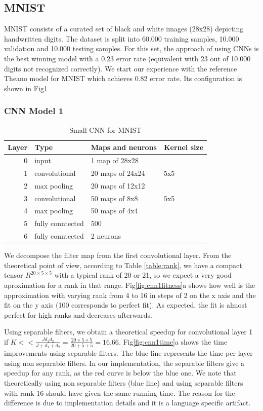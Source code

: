 \documentclass{article} %
\begin{document}
\subsection{MNIST}
MNIST consists of a curated set of black and white images (28x28) depicting handwritten digits.
The dataset is split into 60.000 training samples, 10.000 validation and 
10.000 testing samples. For this set, the approach of \cite{DBLP:journals/corr/abs-1202-2745} using CNNs is the best winning model with a 0.23 error rate (equivalent with 23 out of 10.000 digits not recognized correctly).
We start our experience with the reference Theano model for MNIST which achieves 0.82 error rate. Its configuration is shown in Fig\ref{fig:cnn1}
\subsubsection{CNN Model 1}
\begin{table}
\centering
\begin{tabular}{@{}rlll@{}}\toprule
Layer & Type & Maps and neurons& Kernel size \\ \midrule
0 & input & 1 map of 28x28 &\\
1& convolutional & 20 maps of 24x24 & 5x5\\
2 & max pooling & 20 maps of 12x12 &  \\
3 & convolutional & 50 maps of 8x8& 5x5 \\
4 & max pooling & 50 maps of 4x4&  \\ 
5 & fully conntected& 500 & \\
6 & fully conntected & 2 neurons & \\ \bottomrule
\end{tabular}
\caption{Small CNN for MNIST}
\label{fig:cnn1}
\end{table}

We decompose the filter map from the first convolutional layer. From the theoretical point of view, according to Table \ref{table:rank}, we have a compact tensor $R^{20\times 5 \times 5}$ with a typical rank of 20 or 21, so we expect a very good aproximation for a rank in that range. 
Fig\ref{fig:cnn1fitness}a shows how well is the approximation with varying rank from 4 to 16 in steps of 2 on the x axis and the fit on the y axis (100 corresponds to perfect fit). As expected, the fit is almost perfect for high ranks and decreases afterwards.

Using separable filters, we obtain a theoretical speedup for convolutional layer 1 if $K<< \frac{Jd_{1}d_{2}}{J +d_{1}+d_{2}} = \frac{20\times 5\times 5}{20 + 5 + 5} = 16.66$. Fig\ref{fig:cnn1time}a shows the time improvements using separable filters. The blue line represents the time per layer using non separable filters. In our implementation, the separable filters give a speedup for any rank, as the red curve is below the blue one. 
We note that theoretically using non separable filters (blue line) and using separable filters with rank 16 should have given the same running time. The reason for the difference is due to implementation details and it is a language specific artifact.
\end{document}
